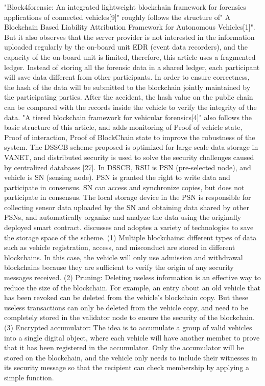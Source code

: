 "Block4forensic: An integrated lightweight blockchain framework for forensics applications of connected vehicles[9]" roughly follows the structure of" A Blockchain Based Liability Attribution Framework for Autonomous Vehicles[1]". But it also observes that the server provider is not interested in the information uploaded regularly by the on-board unit EDR (event data recorders), and the capacity of the on-board unit is limited, therefore, this article uses a fragmented ledger. Instead of storing all the forensic data in a shared ledger, each participant will save data different from other participants. In order to ensure correctness, the hash of the data will be submitted to the blockchain jointly maintained by the participating parties. After the accident, the hash value on the public chain can be compared with the records inside the vehicle to verify the integrity of the data. "A tiered blockchain framework for vehicular forensics[4]" also follows the basic structure of this article, and adds monitoring of Proof of vehicle state, Proof of interaction, Proof of BlockChain state to improve the robustness of the system.
The DSSCB scheme \cite{ref30} proposed is optimized for large-scale data storage in VANET, and distributed security is used to solve the security challenges caused by centralized databases [27]. In DSSCB, RSU is PSN (pre-selected node), and vehicle is SN (sensing node). PSN is granted the right to write data and participate in consensus. SN can access and synchronize copies, but does not participate in consensus. The local storage device in the PSN is responsible for collecting sensor data uploaded by the SN and obtaining data shared by other PSNs, and automatically organize and analyze the data using the originally deployed smart contract.
\cite{ref58} discusses and adoptes a variety of technologies to save the storage space of the scheme. (1) Multiple blockchains: different types of data such as vehicle registration, access, and misconduct are stored in different blockchains. In this case, the vehicle will only use admission and withdrawal blockchains because they are sufficient to verify the origin of any security messages received. (2) Pruning: Deleting useless information is an effective way to reduce the size of the blockchain. For example, an entry about an old vehicle that has been revoked can be deleted from the vehicle's blockchain copy. But these useless transactions can only be deleted from the vehicle copy, and need to be completely stored in the validator node to ensure the security of the blockchain. (3) Encrypted accumulator: The idea is to accumulate a group of valid vehicles into a single digital object, where each vehicle will have another member to prove that it has been registered in the accumulator. Only the accumulator will be stored on the blockchain, and the vehicle only needs to include their witnesses in its security message so that the recipient can check membership by applying a simple function.

